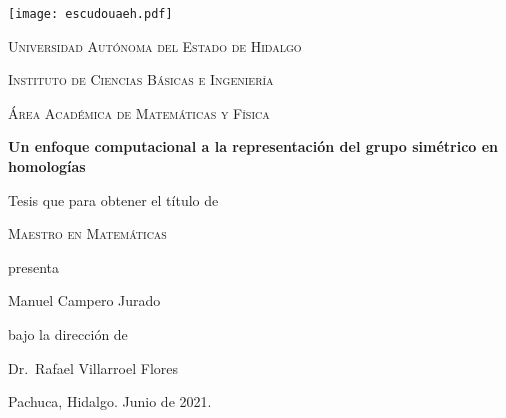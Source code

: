 \documentclass[12pt]{book}
\theoremstyle{definition}
\newcounter{in}
\newcommand{\elespacio}{1.4cm}
\begin{document}
\mainmatter 
\begin{titlepage}
  \begin{center}
    \null
    \vspace*{\fill}

    \texttt{[image: escudouaeh.pdf]}

    \vspace*{\elespacio}

    \textsc{Universidad Autónoma del Estado de Hidalgo}

    \textsc{Instituto de Ciencias Básicas e Ingeniería}

    \textsc{Área Académica de Matemáticas y Física}

    \vspace*{\elespacio}

    {\Huge\bfseries Un enfoque computacional a la representación del grupo simétrico en homologías\par}

    \vspace*{\elespacio}

    {\large Tesis que para obtener el título de}

    \vspace*{\elespacio}

    {\Large\textsc{Maestro en Matemáticas}}

    \vspace*{\elespacio}

    {\large presenta}

    \vspace*{\elespacio}

    {\Huge Manuel Campero Jurado}

    \vspace*{\elespacio}

    {\large bajo la dirección de}

    \bigskip

    {\Large Dr.~Rafael Villarroel Flores}

    \bigskip

    {Pachuca, Hidalgo. Junio de 2021.}

    \vspace*{\fill}

  \end{center}
\end{titlepage}

\thispagestyle{empty}

\tableofcontents

\newpage
\end{document}
